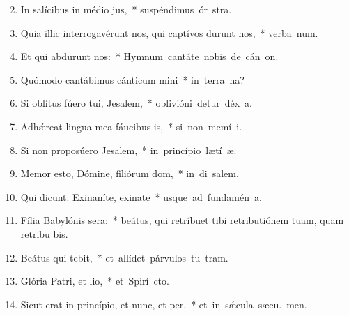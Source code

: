 \begin{flushleft}
\begin{enumerate}[leftmargin=*]
\setcounter{enumi}{1}

\item In salícibus in médio jus,~* \mbox{suspéndimus ór stra.}
\item Quia illic interrogavérunt nos, qui captívos durunt nos,~* \mbox{verba num.}
\item Et qui abdurunt nos:~* \mbox{Hymnum cantáte nobis de cán on.}
\item Quómodo cantábimus cánticum mini~* \mbox{in terra na?}
\item Si oblítus fúero tui, Jesalem,~* \mbox{oblivióni detur déx a.}
\item Adh\'{\ae}reat lingua mea fáucibus is,~* \mbox{si non memí i.}
\item Si non proposúero Jesalem,~* \mbox{in princípio lætí æ.}
\item Memor esto, Dómine, filiórum dom,~* \mbox{in di salem.}
\item Qui dicunt: Exinaníte, exinate~* \mbox{usque ad fundamén  a.}
\item Fília Babylónis sera:~* beátus, qui retríbuet tibi retributiónem tuam, quam retribu bis.
\item Beátus qui tebit,~* \mbox{et allídet párvulos tu  tram.}
\item Glória Patri, et lio,~* \mbox{et Spirí cto.}
\item Sicut erat in princípio, et nunc, et per,~* \mbox{et in s\'{\ae}cula sæcu. men.}


\end{enumerate}
\end{flushleft}

